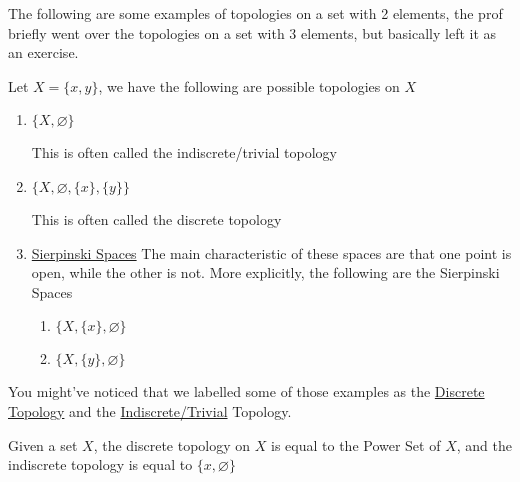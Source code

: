 The following are some examples of topologies on a set with 2 elements, the prof briefly went over the topologies on a set with 3 elements, but basically left it as an exercise.
\begin{example}
    Let $X=\{x,y\}$, we have the following are possible topologies on $X$
    \begin{enumerate}
        \item $\{X,\varnothing\}$
        
        This is often called the indiscrete/trivial topology
        \item $\{X,\varnothing,\{x\},\{y\}\}$
        
        This is often called the discrete topology

        \item\href{https://en.wikipedia.org/wiki/Sierpi%C5%84ski_space}{Sierpinski Spaces}
        \hypertarget{SierpinskiSpace}{}
        The main characteristic of these spaces are that one point is open, while the other is not. More explicitly, the following are the Sierpinski Spaces
        \begin{enumerate}
            \item $\{X,\{x\},\varnothing\}$
            \item $\{X,\{y\},\varnothing\}$
        \end{enumerate}
    \end{enumerate}
\end{example}
    You might've noticed that we labelled some of those examples as the \href{https://en.wikipedia.org/wiki/Discrete_space#:~:text=The%20discrete%20topology%20is%20the,set%20in%20the%20discrete%20topology.}{Discrete Topology} and the \href{https://en.wikipedia.org/wiki/Trivial_topology}{Indiscrete/Trivial} Topology.
\begin{definition}
    Given a set $X$, the discrete topology on $X$ is equal to the Power Set of $X$, and the indiscrete topology is equal to $\{x,\varnothing\}$
\end{definition}
    
